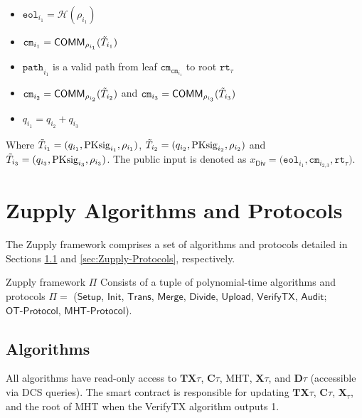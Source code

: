 \begin{itemize}
    \item $\texttt{eol}_{i_1} = \mathcal{H}(\rho_{i_1} )$
	\item $\texttt{cm}_{i_1} = \mathsf{COMM}_{\rho_{i_1}}(\Tilde{T}_{i_1})$
	\item $\texttt{path}_{{i_1}}$ is a valid path from leaf  $\texttt{cm}_{\texttt{cm}_{i_1}}$ to root $\texttt{rt}_\tau$


    \item $\texttt{cm}_{i_2} = \mathsf{COMM}_{\rho_{i_2}}(\Tilde{T}_{i_2})$ and $\texttt{cm}_{i_3} = \mathsf{COMM}_{\rho_{i_3}}(\Tilde{T}_{i_3})$
	\item $q_{i_1} = q_{i_2} + q_{i_3}$
    
\end{itemize}
Where  $\Tilde{T}_{i_1} = (q_{i_1}, \text{PKsig}_{i_1}, \rho_{i_1})$, $\Tilde{T}_{i_2} = (q_{i_2}, \text{PKsig}_{i_2}, \rho_{i_2})$ and $\Tilde{T}_{i_3} = (q_{i_3}, \text{PKsig}_{i_3}, \rho_{i_3})$. The public input is denoted as $x_\mathsf{Div} =\big(\texttt{eol}_{i_1}, \texttt{cm}_{i_{2,3}}, \texttt{rt}_\tau \big)$.

\section{Zupply Algorithms and Protocols}
\label{sec:Zupply Algorithms}
The Zupply framework comprises a set of  algorithms and protocols detailed in Sections \ref{sec:Zupply-Algorithms} and \ref{sec:Zupply-Protocols}, respectively.

\begin{definition}
\label{def:Zupply Framework}
Zupply framework $\Pi$ Consists of a tuple of polynomial-time algorithms and protocols $\Pi = $ ($\textsf{Setup}$, $\textsf{Init}$,  $\textsf{Trans}$, $\textsf{Merge}$, $\textsf{Divide}$, $\textsf{Upload}$, $\textsf{VerifyTX}$, $\textsf{Audit}$; $\textsf{OT-Protocol}$, $\textsf{MHT-Protocol}$).
\end{definition}



\subsection{Algorithms} \label{sec:Zupply-Algorithms}%
All algorithms have read-only access to $\mathbf{TX}\tau$, $\mathbf{C}\tau$, \textsf{MHT}, $\mathbf{X}\tau$, and $\mathbf{D}\tau$ (accessible via \textsf{DCS} queries). The smart contract is responsible for updating $\mathbf{TX}\tau$, $\mathbf{C}\tau$, $\mathbf{X}_\tau$, and the root of \textsf{MHT} when the \textsf{VerifyTX} algorithm outputs 1.

